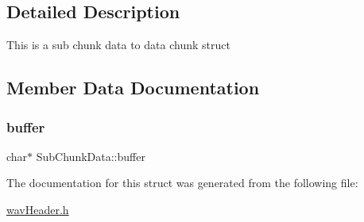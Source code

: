 \subsection{Detailed Description}
This is a sub chunk data to data chunk struct 

\subsection{Member Data Documentation}
\mbox{\label{structSubChunkData_a8f026b9f6a0e1f74318438e61656955e}} 
\subsubsection{\texorpdfstring{buffer}{buffer}}
{\footnotesize\ttfamily char$\ast$ Sub\+Chunk\+Data\+::buffer}



The documentation for this struct was generated from the following file\+:\begin{DoxyCompactItemize}
\item 
\hyperlink{wavHeader_8h}{wav\+Header.\+h}\end{DoxyCompactItemize}
